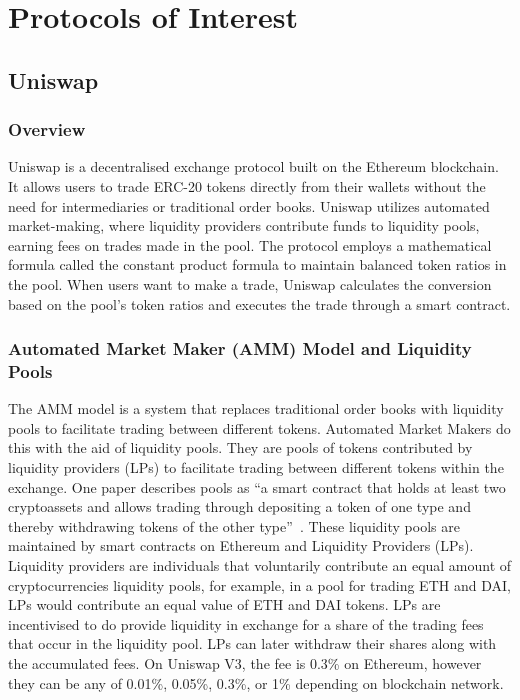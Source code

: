 \section{Protocols of Interest}
\subsection{Uniswap}

\subsubsection{Overview}
Uniswap is a decentralised exchange protocol built on the Ethereum blockchain. It allows users to trade ERC-20 tokens directly from their wallets without the need for intermediaries or traditional order books. Uniswap utilizes automated market-making, where liquidity providers contribute funds to liquidity pools, earning fees on trades made in the pool. The protocol employs a mathematical formula called the constant product formula to maintain balanced token ratios in the pool. When users want to make a trade, Uniswap calculates the conversion based on the pool's token ratios and executes the trade through a smart contract.

\subsubsection{Automated Market Maker (AMM) Model and Liquidity Pools}

The AMM model is a system that replaces traditional order books with liquidity pools to facilitate trading between different tokens. Automated Market Makers do this with the aid of liquidity pools. They are pools of tokens contributed by liquidity providers (LPs) to facilitate trading between different tokens within the exchange. One paper describes pools as ``a smart contract that holds at least two cryptoassets and allows trading through depositing a token of one type and thereby withdrawing tokens of the other type''~\cite{schar2021decentralized}. These liquidity pools are maintained by smart contracts on Ethereum and Liquidity Providers (LPs). Liquidity providers are individuals that voluntarily contribute an equal amount of cryptocurrencies liquidity pools, for example, in a pool for trading ETH and DAI, LPs would contribute an equal value of ETH and DAI tokens. LPs are incentivised to do provide liquidity in exchange for a share of the trading fees that occur in the liquidity pool. LPs can later withdraw their shares along with the accumulated fees. On Uniswap V3, the fee is 0.3\% on Ethereum, however they can be any of 0.01\%, 0.05\%, 0.3\%, or 1\% depending on blockchain network.

